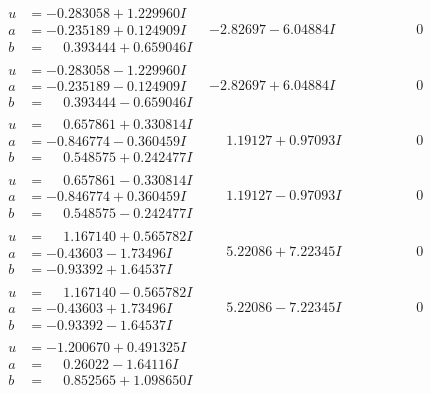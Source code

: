\documentclass[1p]{elsarticle_modified}
\theoremstyle{definition}
\begin{document}
$$\begin{array}{c|c|c}
\begin{aligned}
u &= -0.283058 + 1.229960 I \\
a &= -0.235189 + 0.124909 I \\
b &= \phantom{-}0.393444 + 0.659046 I\end{aligned}
 & -2.82697 - 6.04884 I & \phantom{-0.000000 } 0 \\ \hline\begin{aligned}
u &= -0.283058 - 1.229960 I \\
a &= -0.235189 - 0.124909 I \\
b &= \phantom{-}0.393444 - 0.659046 I\end{aligned}
 & -2.82697 + 6.04884 I & \phantom{-0.000000 } 0 \\ \hline\begin{aligned}
u &= \phantom{-}0.657861 + 0.330814 I \\
a &= -0.846774 - 0.360459 I \\
b &= \phantom{-}0.548575 + 0.242477 I\end{aligned}
 & \phantom{-}1.19127 + 0.97093 I & \phantom{-0.000000 } 0 \\ \hline\begin{aligned}
u &= \phantom{-}0.657861 - 0.330814 I \\
a &= -0.846774 + 0.360459 I \\
b &= \phantom{-}0.548575 - 0.242477 I\end{aligned}
 & \phantom{-}1.19127 - 0.97093 I & \phantom{-0.000000 } 0 \\ \hline\begin{aligned}
u &= \phantom{-}1.167140 + 0.565782 I \\
a &= -0.43603 - 1.73496 I \\
b &= -0.93392 + 1.64537 I\end{aligned}
 & \phantom{-}5.22086 + 7.22345 I & \phantom{-0.000000 } 0 \\ \hline\begin{aligned}
u &= \phantom{-}1.167140 - 0.565782 I \\
a &= -0.43603 + 1.73496 I \\
b &= -0.93392 - 1.64537 I\end{aligned}
 & \phantom{-}5.22086 - 7.22345 I & \phantom{-0.000000 } 0 \\ \hline\begin{aligned}
u &= -1.200670 + 0.491325 I \\
a &= \phantom{-}0.26022 - 1.64116 I \\
b &= \phantom{-}0.852565 + 1.098650 I\end{aligned}

\end{array}$$
\end{document}
